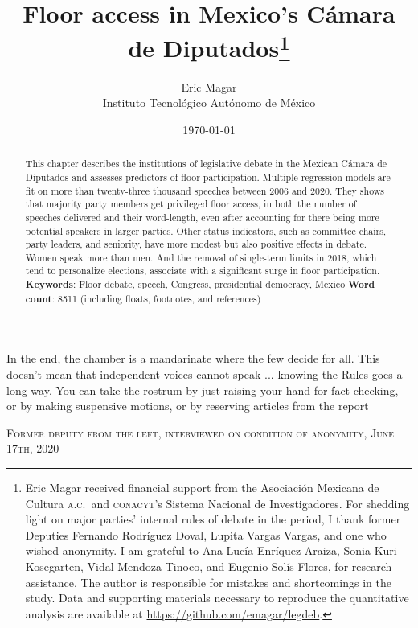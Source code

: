 \documentclass[letter,12pt]{article}
\begin{document}
\title{Floor access in Mexico's Cámara de Diputados\thanks{Eric Magar received financial support from the Asociaci\'on Mexicana de Cultura \textsc{a.c.}\ and \textsc{conacyt}'s Sistema Nacional de Investigadores. For shedding light on major parties' internal rules of debate in the period, I thank former Deputies Fernando Rodríguez Doval, Lupita Vargas Vargas, and one who wished anonymity. I am grateful to Ana Lucía Enríquez Araiza, Sonia Kuri Kosegarten, Vidal Mendoza Tinoco, and Eugenio Solís Flores, for research assistance. The author is responsible for mistakes and shortcomings in the study. Data and supporting materials necessary to reproduce the quantitative analysis are available at \url{https://github.com/emagar/legdeb}.}}
\author{Eric Magar \\ Instituto Tecnológico Autónomo de México}
\date{\today}
\maketitle




\begin{abstract}
\noindent This chapter describes the institutions of legislative debate in the Mexican Cámara de Diputados and assesses predictors of floor participation. Multiple regression models are fit on more than twenty-three thousand speeches between 2006 and 2020. They shows that majority party members get privileged floor access, in both the number of speeches delivered and their word-length, even after accounting for there being more potential speakers in larger parties. Other status indicators, such as committee chairs, party leaders, and seniority, have more modest but also positive effects in debate. Women speak more than men. And the removal of single-term limits in 2018, which tend to personalize elections, associate with a significant surge in floor participation. 
\newline
\newline
\textbf{Keywords}: Floor debate, speech, Congress, presidential democracy, Mexico
\newline
\newline
\textbf{Word count}: 8511 (including floats, footnotes, and references)
\end{abstract}

\newpage

\singlespacing
\epigraph{In the end, the chamber is a mandarinate where the few decide for all. This doesn't mean that independent voices cannot speak ... knowing the Rules goes a long way. You can take the rostrum by just raising your hand for fact checking, or by making suspensive motions, or by reserving articles from the report}%
{\textsc{Former deputy from the left, interviewed on condition of anonymity, June 17th, 2020}}
\doublespacing
\end{document}
